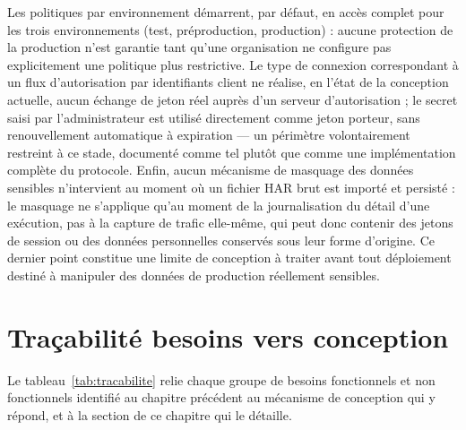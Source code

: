 Les politiques par environnement démarrent, par défaut, en accès complet pour les trois environnements (test, préproduction, production) : aucune protection de la production n'est garantie tant qu'une organisation ne configure pas explicitement une politique plus restrictive. Le type de connexion correspondant à un flux d'autorisation par identifiants client ne réalise, en l'état de la conception actuelle, aucun échange de jeton réel auprès d'un serveur d'autorisation ; le secret saisi par l'administrateur est utilisé directement comme jeton porteur, sans renouvellement automatique à expiration — un périmètre volontairement restreint à ce stade, documenté comme tel plutôt que comme une implémentation complète du protocole. Enfin, aucun mécanisme de masquage des données sensibles n'intervient au moment où un fichier HAR brut est importé et persisté : le masquage ne s'applique qu'au moment de la journalisation du détail d'une exécution, pas à la capture de trafic elle-même, qui peut donc contenir des jetons de session ou des données personnelles conservés sous leur forme d'origine. Ce dernier point constitue une limite de conception à traiter avant tout déploiement destiné à manipuler des données de production réellement sensibles.

\section{Traçabilité besoins vers conception}
\label{sec:tracabilite}

Le tableau~\ref{tab:tracabilite} relie chaque groupe de besoins fonctionnels et non fonctionnels identifié au chapitre précédent au mécanisme de conception qui y répond, et à la section de ce chapitre qui le détaille.


